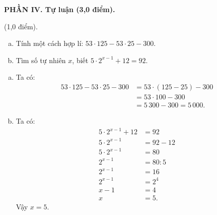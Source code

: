 \vspace{8pt}

\noindent\textbf{PHẦN IV. Tự luận (3,0 điểm).}

\setcounter{bt}{18}

\begin{bt}%
	(1,0 điểm).
	\begin{enumerate}[a)]
		\item Tính một cách hợp lí: $53 \cdot 125 - 53 \cdot 25 - 300$.
		\item Tìm số tự nhiên $x$, biết $5 \cdot 2^{x-1} + 12 = 92$.
	\end{enumerate}
	\begin{loigiai}
		\begin{enumerate}[a)]
			\item Ta có:
			\begin{align*}
				53 \cdot 125 - 53 \cdot 25 - 300 &= 53 \cdot (125 - 25) - 300\\
				&= 53 \cdot 100 - 300\\
				&= 5\,300 - 300 = 5\,000.
			\end{align*}
			\item Ta có:
			\begin{align*}
				5 \cdot 2^{x-1} + 12 &= 92\\
				5 \cdot 2^{x-1} &= 92 - 12\\
				5 \cdot 2^{x-1} &= 80\\
				2^{x-1} &= 80 : 5\\
				2^{x-1} &= 16\\
				2^{x-1} &= 2^4\\
				x - 1 &= 4\\
				x &= 5.
			\end{align*}
			Vậy $x = 5$.
		\end{enumerate}
	\end{loigiai}
\end{bt}

